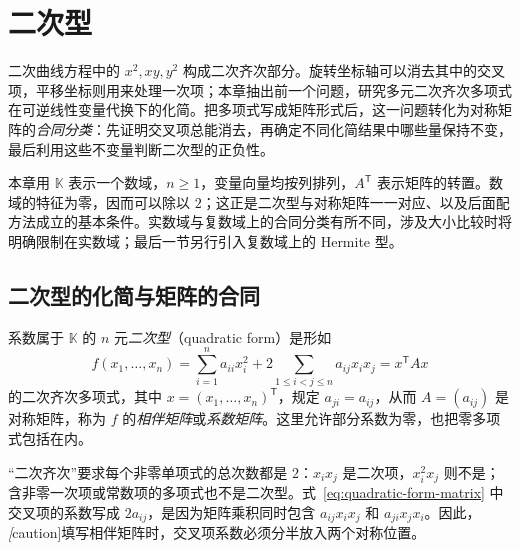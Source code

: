 \setcounter{chapter}{7} %
\chapter{二次型}
\label{chap:quadratic-forms}

二次曲线方程中的 $x^2,xy,y^2$ 构成二次齐次部分。旋转坐标轴可以消去其中的交叉项，平移坐标则用来处理一次项；本章抽出前一个问题，研究多元二次齐次多项式在可逆线性变量代换下的化简。把多项式写成矩阵形式后，这一问题转化为对称矩阵的\emph{合同分类}：先证明交叉项总能消去，再确定不同化简结果中哪些量保持不变，最后利用这些不变量判断二次型的正负性。

本章用 $\mathbb K$ 表示一个数域，$n\geq 1$，变量向量均按列排列，$A^{\mathsf T}$ 表示矩阵的转置。数域的特征为零，因而可以除以 $2$；这正是二次型与对称矩阵一一对应、以及后面配方法成立的基本条件。实数域与复数域上的合同分类有所不同，涉及大小比较时将明确限制在实数域；最后一节另行引入复数域上的 Hermite 型。

\section{二次型的化简与矩阵的合同}
\label{sec:quadratic-congruence}

\begin{definition}
\label{def:quadratic-form-matrix}
系数属于 $\mathbb K$ 的 $n$ 元\emph{二次型}（quadratic form）是形如
\begin{equation}
\label{eq:quadratic-form-matrix}
    f(x_1,\ldots,x_n)
    =\sum_{i=1}^n a_{ii}x_i^2+2\sum_{1\leq i<j\leq n}a_{ij}x_ix_j
    =x^{\mathsf T}Ax
\end{equation}
的二次齐次多项式，其中 $x=(x_1,\ldots,x_n)^{\mathsf T}$，规定 $a_{ji}=a_{ij}$，从而 $A=(a_{ij})$ 是对称矩阵，称为 $f$ 的\emph{相伴矩阵}或\emph{系数矩阵}。这里允许部分系数为零，也把零多项式包括在内。
\end{definition}

“二次齐次”要求每个非零单项式的总次数都是 $2$：$x_ix_j$ 是二次项，$x_i^2x_j$ 则不是；含非零一次项或常数项的多项式也不是二次型。式~\eqref{eq:quadratic-form-matrix} 中交叉项的系数写成 $2a_{ij}$，是因为矩阵乘积同时包含 $a_{ij}x_ix_j$ 和 $a_{ji}x_jx_i$。因此，\emph[caution]{填写相伴矩阵时，交叉项系数必须分半放入两个对称位置}。

